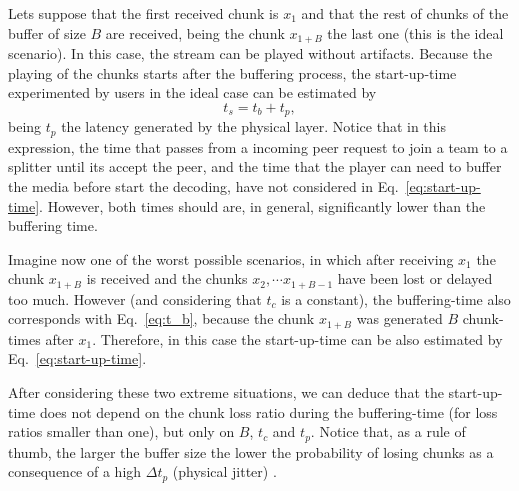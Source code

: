 Lets suppose that the first received chunk is $x_1$ and that the rest
of chunks of the buffer of size $B$ are received, being the chunk
$x_{1+B}$ the last one (this is the ideal scenario). In this case, the
stream can be played without artifacts. Because the playing of the
chunks starts after the buffering process, the \gls{start-up-time}
experimented by users in the ideal case can be estimated by
\begin{equation}
  t_s = t_b + t_p,
  \label{eq:start-up-time}
\end{equation}
being $t_p$ the latency generated by the physical layer. Notice that
in this expression, the time that passes from a incoming peer request
to join a team to a splitter until its accept the peer, and the time
that the player can need to buffer the media before start the
decoding, have not considered in Eq.~\ref{eq:start-up-time}. However,
both times should are, in general, significantly lower than the
buffering time.

Imagine now one of the worst possible scenarios, in which after
receiving $x_1$ the chunk $x_{1+B}$ is received and the
chunks $x_2, \cdots x_{1+B-1}$ have been lost or delayed too much.
However (and considering that $t_c$ is a constant), the buffering-time
also corresponds with Eq.~\ref{eq:t_b}, because the chunk $x_{1+B}$
was generated $B$ chunk-times after $x_1$. Therefore, in this case the
start-up-time can be also estimated by Eq.~\ref{eq:start-up-time}.

After considering these two extreme situations, we can deduce that the
start-up-time does not depend on the chunk loss ratio during the
buffering-time (for loss ratios smaller than one), but only on $B$,
$t_c$ and $t_p$. Notice that, as a rule of thumb, the larger the
buffer size the lower the probability of losing chunks as a
consequence of a high $\Delta t_p$ (physical jitter) .
